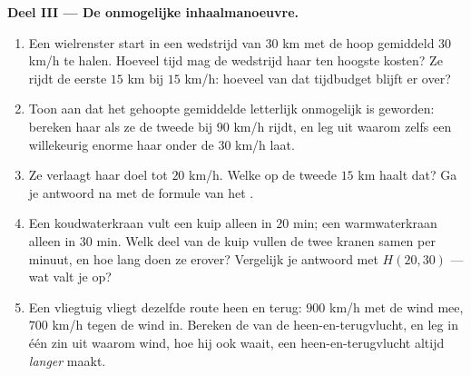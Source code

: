 \begin{problem}
\medskip
\noindent\textbf{Deel III --- De onmogelijke inhaalmanoeuvre.}
\begin{enumerate}[resume]
  \item Een wielrenster start in een wedstrijd van $30$ km met de hoop gemiddeld
        $30$ km/h te halen. Hoeveel tijd mag de wedstrijd haar ten hoogste
        kosten? Ze rijdt de eerste $15$ km bij $15$ km/h: hoeveel van dat
        tijdbudget blijft er over?
  \item Toon aan dat het gehoopte gemiddelde letterlijk onmogelijk is geworden:
        bereken haar  als ze de tweede  bij $90$ km/h
        rijdt, en leg uit waarom zelfs een willekeurig enorme  haar onder
        de $30$ km/h laat.
  \item Ze verlaagt haar doel tot $20$ km/h. Welke  op de tweede $15$ km
        haalt dat? Ga je antwoord na met de formule van het .
  \item Een koudwaterkraan vult een kuip alleen in $20$ min; een warmwaterkraan
        alleen in $30$ min. Welk deel van de kuip vullen de twee kranen samen per
        minuut, en hoe lang doen ze erover? Vergelijk je antwoord met
        $H(20, 30)$ --- wat valt je op?
  \item Een vliegtuig vliegt dezelfde route heen en terug: $900$ km/h met de wind
        mee, $700$ km/h tegen de wind in. Bereken de  van de
        heen-en-terugvlucht, en leg in één zin uit waarom wind, hoe hij ook
        waait, een heen-en-terugvlucht altijd \emph{langer} maakt.
\end{enumerate}
\end{problem}

